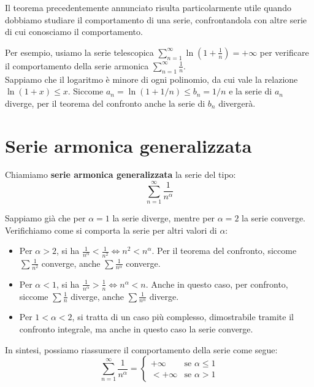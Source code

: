 \documentclass[12pt]{report}
\begin{document}
	Il teorema precedentemente annunciato risulta particolarmente utile quando dobbiamo studiare il comportamento di una serie, confrontandola con altre serie di cui conosciamo il comportamento.
	
	Per esempio, usiamo la serie telescopica $\sum_{n=1}^{\infty} \ln\left(1 + \frac{1}{n}\right) = +\infty$ per verificare il comportamento della serie armonica $\sum_{n=1}^{\infty} \frac{1}{n}$.\\
	Sappiamo che il logaritmo è minore di ogni polinomio, da cui vale la relazione $\ln(1+x) \leq x$.
	Siccome $a_n = \ln(1 + 1/n) \leq b_n = 1/n$ e la serie di $a_n$ diverge, per il teorema del confronto anche la serie di $b_n$ divergerà.
	
	\section{Serie armonica generalizzata}
	
	Chiamiamo \textbf{serie armonica generalizzata} la serie del tipo:
	\[
	\sum_{n=1}^{\infty} \frac{1}{n^\alpha}
	\]
	
	Sappiamo già che per $\alpha = 1$ la serie diverge, mentre per $\alpha = 2$ la serie converge. Verifichiamo come si comporta la serie per altri valori di $\alpha$:
	\begin{itemize}
		
		\item Per $\alpha > 2$, si ha $\frac{1}{n^\alpha} < \frac{1}{n^2} \iff n^2 < n^\alpha$. Per il teorema del confronto, siccome $\sum \frac{1}{n^2}$ converge, anche $\sum \frac{1}{n^\alpha}$ converge.
		
		\item Per $\alpha < 1$, si ha $\frac{1}{n^\alpha} > \frac{1}{n} \iff n^\alpha < n$. Anche in questo caso, per confronto, siccome $\sum \frac{1}{n}$ diverge, anche $\sum \frac{1}{n^\alpha}$ diverge.
		
		\item Per $1 < \alpha < 2$, si tratta di un caso più complesso, dimostrabile tramite il confronto integrale, ma anche in questo caso la serie converge.
		
	\end{itemize}
	
	In sintesi, possiamo riassumere il comportamento della serie come segue:
	\[
	\sum_{n=1}^{\infty} \frac{1}{n^\alpha} = 
	\begin{cases}
		+\infty & \text{se } \alpha \leq 1 \\
		< +\infty & \text{se } \alpha > 1
	\end{cases}
	\]
	
\end{document}
